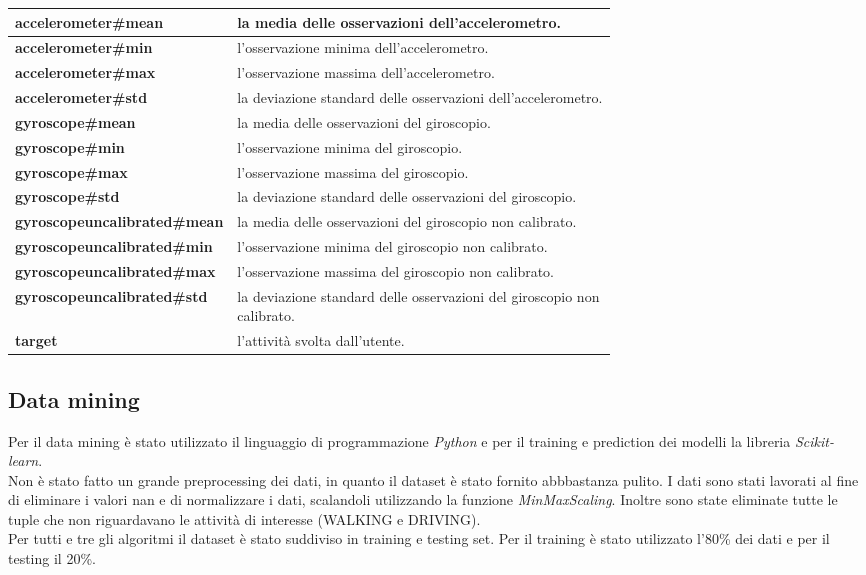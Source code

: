\documentclass[../../Report.tex]{subfiles}
\begin{document}
\begin{table}[H]
    \centering
    \begin{tabular}{|l|p{0.7\linewidth}|}
        \hline
        \textbf{accelerometer\#mean} & la media delle osservazioni dell'accelerometro. \\
        \hline
        \textbf{accelerometer\#min} & l'osservazione minima dell'accelerometro. \\
        \hline
        \textbf{accelerometer\#max} & l'osservazione massima dell'accelerometro. \\
        \hline
        \textbf{accelerometer\#std} & la deviazione standard delle osservazioni dell'accelerometro. \\
        \hline
        \textbf{gyroscope\#mean} & la media delle osservazioni del giroscopio. \\
        \hline
        \textbf{gyroscope\#min} &  l'osservazione minima del giroscopio. \\
        \hline
        \textbf{gyroscope\#max} &  l'osservazione massima del giroscopio. \\
        \hline
        \textbf{gyroscope\#std} & la deviazione standard delle osservazioni del giroscopio. \\
        \hline
        \textbf{gyroscopeuncalibrated\#mean} & la media delle osservazioni del giroscopio non calibrato. \\
        \hline
        \textbf{gyroscopeuncalibrated\#min} &  l'osservazione minima del giroscopio non calibrato. \\
        \hline
        \textbf{gyroscopeuncalibrated\#max} & l'osservazione massima del giroscopio non calibrato. \\
        \hline
        \textbf{gyroscopeuncalibrated\#std} & la deviazione standard delle osservazioni del giroscopio non calibrato.\\
        \hline
        \textbf{target} & l'attività svolta dall'utente. \\
        \hline
    \end{tabular}
\end{table}

\subsection{Data mining}
    Per il data mining è stato utilizzato il linguaggio di programmazione \emph{Python} e per il training e prediction dei modelli la libreria \emph{Scikit-learn}.\\
    Non è stato fatto un grande preprocessing dei dati, in quanto il dataset è stato fornito abbbastanza pulito. I dati sono stati lavorati al fine di eliminare i valori nan e di normalizzare i dati, scalandoli utilizzando la funzione \emph{MinMaxScaling}. Inoltre sono state eliminate tutte le tuple che non riguardavano le attività di interesse (WALKING e DRIVING).\\
    Per tutti e tre gli algoritmi il dataset è stato suddiviso in training e testing set. Per il training è stato utilizzato l'80\% dei dati e per il testing il 20\%.\\
\end{document}
